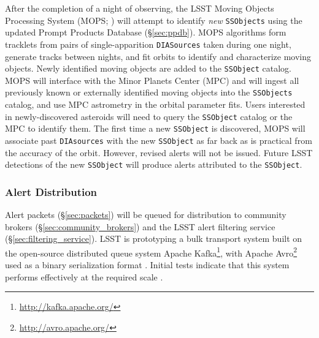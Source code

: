 After the completion of a night of observing,
the LSST Moving Objects Processing System (MOPS; ) will attempt to identify \textit{new} \texttt{SSObjects} using the updated Prompt Products Database (\S \ref{sec:ppdb}).
MOPS algorithms form tracklets from pairs of single-apparition \texttt{DIASources} taken during one night, generate tracks between nights, and fit orbits to identify and characterize moving objects.
Newly identified moving objects are added to the {\tt SSObject} catalog.
MOPS will interface with the Minor Planets Center (MPC) and will ingest all previously known or externally identified moving objects into the {\tt SSObjects} catalog, and use MPC astrometry in the orbital parameter fits.
Users interested in newly-discovered asteroids will need to query the \texttt{SSObject} catalog or the MPC to identify them.
The first time a new \texttt{SSObject} is discovered, MOPS will associate past \texttt{DIAsources} with the new \texttt{SSObject} as far back as is practical from the accuracy of the orbit.
However, revised alerts will not be issued.
Future LSST detections of the new \texttt{SSObject} will produce alerts attributed to the \texttt{SSObject}.


\subsubsection{Alert Distribution} \label{sec:alert_distribution}

Alert packets (\S \ref{sec:packets}) will be queued for distribution to community brokers (\S \ref{sec:community_brokers}) and the LSST alert filtering service (\S \ref{sec:filtering_service}).
LSST is prototyping  a bulk transport system built on the open-source distributed queue system Apache Kafka\footnote{\url{http://kafka.apache.org/}}, with Apache Avro\footnote{\url{http://avro.apache.org/}} used as a binary serialization format .
Initial tests indicate that this system performs effectively at the required scale .


